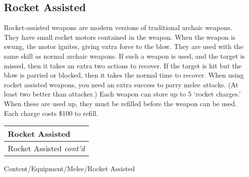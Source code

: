 \documentclass[twoside]{book}
\begin{document}
\hspace{-2ex}

\vspace{1ex}
    
\hspace{-2ex}

\vspace{1ex}
    
\hspace{-2ex}

\vspace{1ex}
    
    

\subsection{Rocket Assisted}
      Rocket-assisted weapons are modern versions of
               traditional archaic weapons. They have small rocket motors
               contained in the weapon. When the weapon is swung, the
               motor ignites, giving extra force to the blow. They are
               used with the same skill as normal archaic weapons.
                 If such a weapon is used, and the target is missed,
               then it takes an extra two actions to recover. If the
               target is hit but the blow is parried or blocked, then it
               takes the normal time to recover.   When using rocket assisted weapons, you need an
               extra success to parry melee attacks. (At least two better
               than attacker.)   Each weapon can store up to 5 `rocket
               charges.' When these are used up, they must be
               refilled before the weapon can be used. Each charge costs
               \$100 to refill. 
\begin{longtable}{p{1.25in}} 
  Rocket Assisted
  \\
  \hline
  \hline
  \endfirsthead
  Rocket Assisted \textit{cont'd}
        
  \\
  \endhead
      
\end{longtable}
    Content/Equipment/Melee/Rocket Assisted
    
\end{document}

